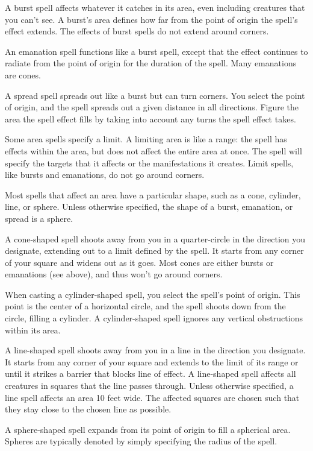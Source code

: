 A burst spell affects whatever it catches in its area, even including creatures that you can't see. A burst's area defines how far from the point of origin the spell's effect extends. The effects of burst spells do not extend around corners.

An emanation spell functions like a burst spell, except that the effect continues to radiate from the point of origin for the duration of the spell. Many emanations are cones.

A spread spell spreads out like a burst but can turn corners. You select the point of origin, and the spell spreads out a given distance in all directions. Figure the area the spell effect fills by taking into account any turns the spell effect takes.

 Some area spells specify a limit. A limiting area is like a range: the spell has effects within the area, but does not affect the entire area at once. The spell will specify the targets that it affects or the manifestations it creates. Limit spells, like bursts and emanations, do not go around corners.

 Most spells that affect an area have a particular shape, such as a cone, cylinder, line, or sphere. Unless otherwise specified, the shape of a burst, emanation, or spread is a sphere.

A cone-shaped spell shoots away from you in a quarter-circle in the direction you designate, extending out to a limit defined by the spell. It starts from any corner of your square and widens out as it goes. Most cones are either bursts or emanations (see above), and thus won't go around corners.

When casting a cylinder-shaped spell, you select the spell's point of origin. This point is the center of a horizontal circle, and the spell shoots down from the circle, filling a cylinder. A cylinder-shaped spell ignores any vertical obstructions within its area.

A line-shaped spell shoots away from you in a line in the direction you designate. It starts from any corner of your square and extends to the limit of its range or until it strikes a barrier that blocks line of effect. A line-shaped spell affects all creatures in squares that the line passes through. Unless otherwise specified, a line spell affects an area 10 feet wide. The affected squares are chosen such that they stay close to the chosen line as possible.

A sphere-shaped spell expands from its point of origin to fill a spherical area. Spheres are typically denoted by simply specifying the radius of the spell.

